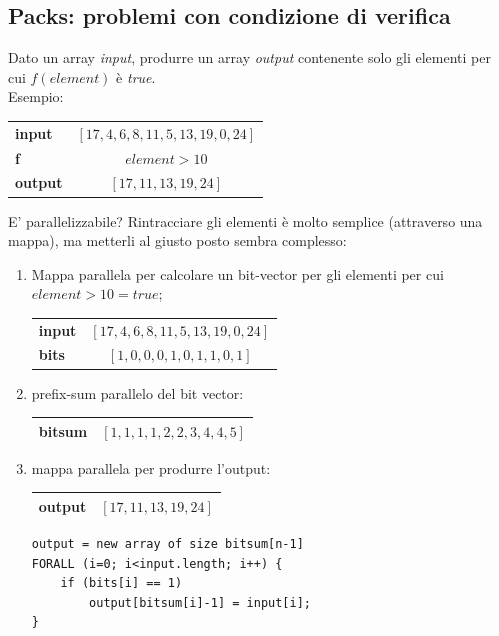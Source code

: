 \subsection{Packs: problemi con condizione di verifica}
Dato un array \textit{input}, produrre un array \textit{output} contenente solo gli elementi per cui $f(element)$ è \textit{true}. \\
Esempio:
\begin{center}
	\begin{tabular}{| l | c |}
		\hline
		\textbf{input} & $[17,4,6,8,11,5,13,19,0,24]$ \\
		\textbf{f} & $element > 10$ \\
		\textbf{output} & $[17,11,13,19,24]$ \\
		\hline
	\end{tabular}
\end{center}
E' parallelizzabile? Rintracciare gli elementi è molto semplice (attraverso una mappa), ma metterli al giusto posto sembra complesso:
\begin{enumerate}
	\item Mappa parallela per calcolare un bit-vector per gli elementi per cui $element > 10 = true$;
	\begin{center}
		\begin{tabular}{| l | c |}
			\hline
			\textbf{input} & $[17,4,6,8,11,5,13,19,0,24]$ \\
			\textbf{bits} & $[1,0,0,0,1,0,1,1,0,1]$ \\
			\hline
		\end{tabular}
	\end{center}
	\item prefix-sum parallelo del bit vector:
	\begin{center}
		\begin{tabular}{| l | c |}
			\hline
			\textbf{bitsum} & $[1,1,1,1,2,2,3,4,4,5]$ \\
			\hline
		\end{tabular}
	\end{center}
	\item mappa parallela per produrre l'output:
	\begin{center}
		\begin{tabular}{| l | c |}
			\hline
			\textbf{output} & $[17,11,13,19,24]$ \\
			\hline
		\end{tabular}
		\begin{lstlisting}
output = new array of size bitsum[n-1]
FORALL (i=0; i<input.length; i++) {
	if (bits[i] == 1)
		output[bitsum[i]-1] = input[i];
}
		\end{lstlisting}
	\end{center}
\end{enumerate}

